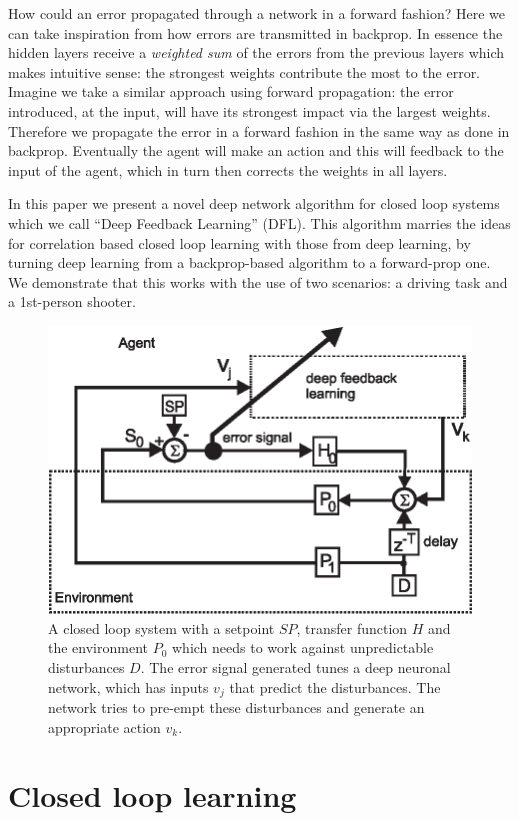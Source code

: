 \documentclass{llncs}
\begin{document}
How could an error propagated through a network in a forward fashion? Here we can
take inspiration from how errors are transmitted in backprop. 
In essence the hidden layers receive a \textsl{weighted sum} of the errors from the
previous layers which makes intuitive sense: the strongest weights
contribute the most to the error. Imagine we take a similar approach using forward propagation: the error introduced, at the input, will have its strongest
impact via the largest weights. Therefore we propagate the error
in a forward fashion in the same way as done in backprop. Eventually the agent
will make an action and this will feedback to the input of the agent, which
in turn then corrects the weights in all layers.

In this paper we present a novel deep network algorithm for closed loop systems
which we call ``Deep Feedback Learning'' (DFL). This algorithm marries the
ideas for correlation based closed loop learning with those from deep learning,
by turning deep learning from a backprop-based algorithm to a forward-prop
one. We demonstrate that this works with the use of two scenarios: a driving task and a 1st-person shooter.

\begin{figure}[h!]
  \centering
  \includegraphics[width=0.75\columnwidth]{closed_loop}
  \caption{A closed loop system with a setpoint $SP$, transfer function $H$ and the
    environment $P_0$ which needs to work against unpredictable disturbances $D$.
    The error signal generated tunes a deep neuronal network, which has inputs
    $v_j$ that predict the disturbances. The network tries to pre-empt these
    disturbances and generate an appropriate action $v_k$.
    \label{closed_loop}}
\end{figure}

\section{Closed loop learning}
\end{document}
